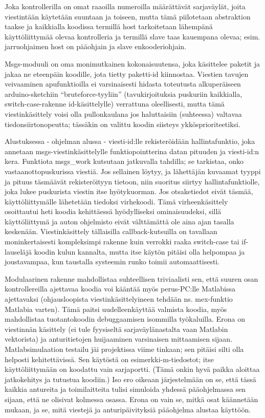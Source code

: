 \documentclass{article}
\begin{document}
Joka kontrollerilla on omat raaoilla numeroilla määrättävät sarjaväylät, joita viestintään käytetään suuntaan ja toiseen, mutta tämä piilotetaan abstraktion taakse ja kaikkialla koodissa termillä host tarkoitetaan lähempänä käyttöliittymää olevaa kontrolleria ja termillä slave taas kauempana olevaa; esim. jarruohjaimen host on pääohjain ja slave enkooderiohjain.

Msgs-moduuli on oma monimutkainen kokonaisuutensa, joka käsittelee paketit ja jakaa ne eteenpäin koodille, jota tietty paketti-id kiinnostaa. Viestien tavujen veivaaminen apufunktioilla ei varsinaisesti hidasta toteutusta alkuperäiseen arduino-sketchiin ``bruteforce-tyyliin'' (tavukirjoituksia puskuriin kaikkialla, switch-case-rakenne id-käsittelylle) verrattuna oleellisesti, mutta tämä viestinkäsittely voisi olla pullonkaulana jos haluttaisiin (suhteessa) valtavaa tiedonsiirtonopeutta; tässäkin on valittu koodin siisteys ykkösprioriteetiksi.

Alustuksessa - ohjelman alussa - viesti-id:lle rekisteröidään hallintafunktio, joka annetaan msgs-viestinkäsittelylle funktiopointterina datan pituuden ja viesti-id:n kera. Funktiota msgs\_work kutsutaan jatkuvalla tahdilla; se tarkistaa, onko vastaanottopuskurissa viestiä. Jos sellainen löytyy, ja lähettäjän kuvaamat tyyppi ja pituus täsmäävät rekisteröityyn tietoon, niin suoritus siirtyy hallintafunktiolle, joka lukee puskurista viestin itse hyötykuorman. Jos otsaketiedot eivät täsmää, käyttöliittymälle lähetetään tiedoksi virhekoodi. Tämä virheenkäsittely osoittautui heti koodia kehittäessä hyödylliseksi ominaisuudeksi, sillä käyttöliittymä ja auton ohjelmisto eivät välttämättä ole aina ajan tasalla keskenään. Viestinkäsittely tällaisilla callback-kutsuilla on tavallaan moninkertaisesti kompleksimpi rakenne kuin verrokki raaka switch-case tai if-lauseläjä koodin kulun kannalta, mutta itse käytön pitäisi olla helpompaa ja joustavampaa, kun taustalla systeemin runko toimii automaattisesti.

Modulaarinen rakenne mahdollistaa suhteellisen triviaalisti sen, että suuren osan kontrollereilla ajettavaa koodia voi kääntää myös perus-PC:lle Matlabissa ajettavaksi (ohjausloopista viestinkäsittelyineen tehdään ns. mex-funktio Matlabia varten). Tämä paitsi uudelleenkäyttää valmista koodia, myös mahdollistaa tuotantokoodin debuggaamisen isommilla työkaluilla. Erona on viestinnän käsittely (ei tule fyysiseltä sarjaväylänastalta vaan Matlabin vektorista) ja anturitietojen huijaaminen varsinaisen mittaamisen sijaan. Matlabsimulaation testailu jäi projektissa viime tinkaan; sen pitäisi silti olla helposti kehitettävissä. Sen käytöstä on esimerkki-m-tiedostot; itse käyttöliittymään on koodattu vain sarjaportti. (Tämä onkin hyvä paikka aloittaa jatkokehitys ja tutustua koodiin.) Iso ero oikeaan järjestelmään on se, että tässä kaikkia antureita ja toimilaitteita tulisi simuloida yhdessä pääohjelmassa sen sijaan, että ne olisivat kolmessa osassa. Erona on vain se, mitkä osat käännetään mukaan, ja se, mitä viestejä ja anturipäivityksiä pääohjelma alustaa käyttöön.
\end{document}
